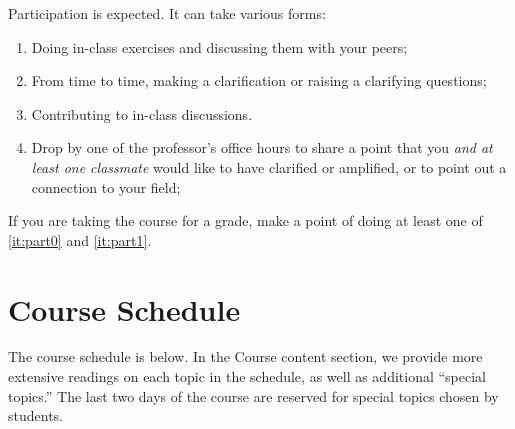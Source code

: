 \documentclass[12pt]{article}
\begin{document}
Participation is expected. It can take various forms:
\begin{enumerate}
\item Doing in-class exercises and discussing them with your peers;
\item From time to time, making a clarification or raising a clarifying questions;
\item \label{it:part0} Contributing to in-class discussions.
\item \label{it:part1} Drop by one of the professor's office hours to share a point that you \textit{and at least one classmate} would like to have clarified or amplified, or to point out a connection to your field;
\end{enumerate}
If you are taking the course for a grade, make a point of doing at
least one of \ref{it:part0} and \ref{it:part1}. %


\section*{Course Schedule}\label{sec:schedule}

The course schedule is below. In the Course content section, we provide more extensive readings on each topic in the schedule, as well as additional ``special topics.'' The last two days of the course are reserved for special topics chosen by students.
\end{document}
